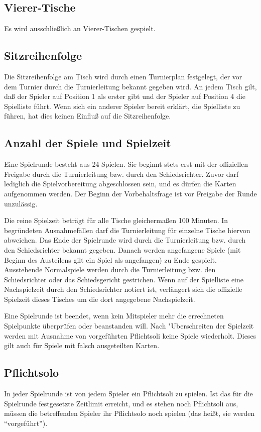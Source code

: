 \documentclass[12pt]{scrartcl}
\begin{document}
\subsection{Vierer-Tische}
Es wird ausschließlich an Vierer-Tischen gespielt.

\subsection{Sitzreihenfolge}
Die Sitzreihenfolge am Tisch wird durch einen Turnierplan
festgelegt, der vor dem Turnier durch die Turnierleitung bekannt
gegeben wird. An jedem Tisch gilt, daß der Spieler auf Position
1 als erster gibt und der Spieler auf Position 4 die Spielliste
führt. Wenn sich ein anderer Spieler bereit erklärt, die
Spielliste zu führen, hat dies keinen Einfluß auf die
Sitzreihenfolge.

\subsection{Anzahl der Spiele und Spielzeit}
Eine Spielrunde besteht aus 24 Spielen. Sie beginnt stets erst
mit der offiziellen Freigabe durch die Turnierleitung bzw. durch
den Schiedsrichter. Zuvor darf lediglich die Spielvorbereitung
abgeschlossen sein, und es dürfen die Karten aufgenommen werden.
Der Beginn der Vorbehaltsfrage ist vor Freigabe der Runde
unzulässig.

Die reine Spielzeit beträgt für alle Tische gleichermaßen 100
Minuten. In begründeten Ausnahmefällen darf die Turnierleitung
für einzelne Tische hiervon abweichen. Das Ende der Spielrunde
wird durch die Turnierleitung bzw. durch den Schiedsrichter
bekannt gegeben. Danach werden angefangene Spiele (mit Beginn des
Austeilens gilt ein Spiel als angefangen) zu Ende gespielt.
Ausstehende Normalspiele werden durch die Turnierleitung bzw. den
Schiedsrichter oder das Schiedsgericht gestrichen. Wenn auf der
Spielliste eine Nachspielzeit durch den Schiedsrichter notiert
ist, verlängert sich die offizielle Spielzeit dieses Tisches um
die dort angegebene Nachspielzeit.

Eine Spielrunde ist beendet, wenn kein Mitspieler mehr die
errechneten Spielpunkte überprüfen oder beanstanden will. Nach
"Uberschreiten der Spielzeit werden mit Ausnahme von vorgeführten
Pflichtsoli keine Spiele wiederholt. Dieses gilt auch für Spiele
mit falsch ausgeteilten Karten.

\subsection{Pflichtsolo}
In jeder Spielrunde ist von jedem Spieler ein Pflichtsoli zu
spielen. Ist das für die Spielrunde festgesetzte Zeitlimit
erreicht, und es stehen noch Pflichtsoli aus, müssen die
betreffenden Spieler ihr Pflichtsolo noch spielen (das heißt,
sie werden "`vorgeführt"').
\end{document}
